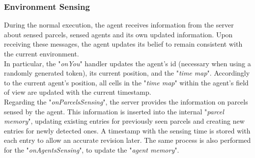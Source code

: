         \subsubsection{Environment Sensing}
            During the normal execution, the agent receives information from the server about sensed parcels, sensed agents and its own updated information. Upon receiving these messages, the agent updates its belief to remain consistent with the current environment.
            \medskip\\
            In particular, the "\textit{onYou}" handler updates the agent's id (necessary when using a randomly generated token), its current position, and the "\textit{time map}". Accordingly to the current agent's position, all cells in the "\textit{time map}" within the agent's field of view are updated with the current timestamp.
            \medskip\\
            Regarding the "\textit{onParcelsSensing}", the server provides the information on parcels sensed by the agent. This information is inserted into the internal "\textit{parcel memory}", updating existing entries for previously seen parcels and creating new entries for newly detected ones. A timestamp with the sensing time is stored with each entry to allow an accurate revision later. The same process is also performed for the "\textit{onAgentsSensing}", to update the "\textit{agent memory}".

